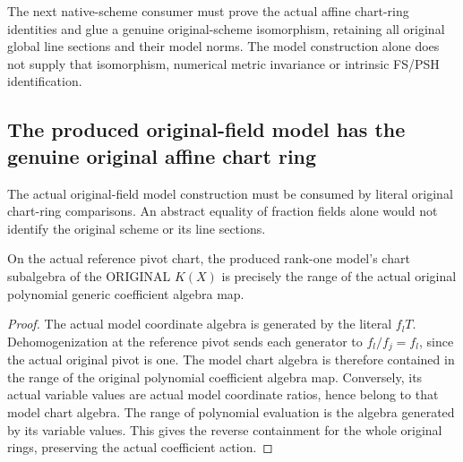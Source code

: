The next native-scheme consumer must prove the actual affine chart-ring
identities and glue a genuine original-scheme isomorphism, retaining
all original global line sections and their model norms. The model
construction alone does not supply that isomorphism, numerical metric
invariance or intrinsic FS/PSH identification.
\subsection{The produced original-field model has the genuine original affine chart ring}
The actual original-field model construction must be consumed by literal
original chart-ring comparisons. An abstract equality of fraction fields
alone would not identify the original scheme or its line sections.

\begin{theorem}
\label{thm:seven-original-produced-model-chart-image-route}
\leanok
{}
On the actual reference pivot chart, the produced rank-one model's
chart subalgebra of the ORIGINAL $K(X)$ is precisely the range of the
actual original polynomial generic coefficient algebra map.
\end{theorem}
\begin{proof}
The actual model coordinate algebra is generated by the literal
$f_lT$. Dehomogenization at the reference pivot sends each generator
to $f_l/f_j=f_l$, since the actual original pivot is one. The model
chart algebra is therefore contained in the range of the original
polynomial coefficient algebra map. Conversely, its actual variable
values are actual model coordinate ratios, hence belong to that model
chart algebra. The range of polynomial evaluation is the algebra
generated by its variable values. This gives the reverse containment
for the whole original rings, preserving the actual coefficient action.
\end{proof}

